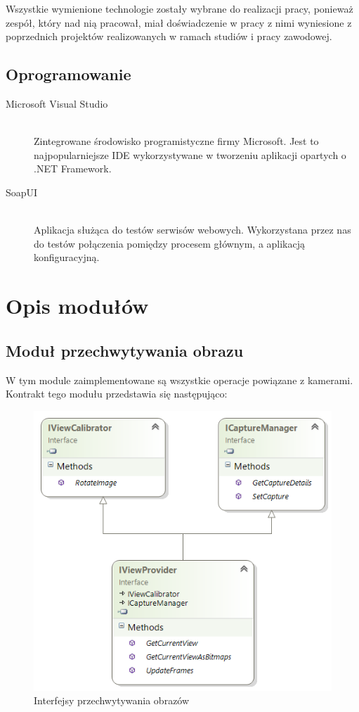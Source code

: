 \documentclass[a4paper,11pt,twoside]{report}
\theoremstyle{definition}
\begin{document}
Wszystkie wymienione technologie zostały wybrane do realizacji pracy, ponieważ zespół, który nad nią pracował, miał doświadczenie w pracy z nimi wyniesione z poprzednich projektów realizowanych w ramach studiów i pracy zawodowej.

\subsection{Oprogramowanie}
\begin{description}
\item [Microsoft Visual Studio] \hfill \\
Zintegrowane środowisko programistyczne firmy Microsoft. Jest to najpopularniejsze IDE wykorzystywane w tworzeniu aplikacji opartych o .NET Framework.
\item [SoapUI] \hfill \\
Aplikacja służąca do testów serwisów webowych. Wykorzystana przez nas do testów połączenia pomiędzy procesem głównym, a aplikacją konfiguracyjną.
\end{description}

\section{Opis modułów}

\subsection{Moduł przechwytywania obrazu}

W tym module zaimplementowane są wszystkie operacje powiązane z kamerami. Kontrakt tego modułu przedstawia się następująco:

\begin{figure}[H]
\centering
\includegraphics[scale=0.9]{images/IViewProvider}
\caption[Przechwytywanie diagram]{Interfejsy przechwytywania obrazów}
\end{figure}
\end{document}
